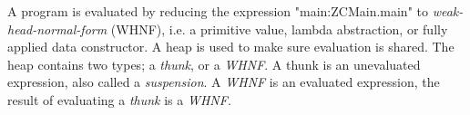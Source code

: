 A program is evaluated by reducing the expression "main:ZCMain.main" to 
\emph{weak-head-normal-form} (WHNF), i.e. a primitive value, lambda abstraction, or 
fully applied data constructor. A heap is used to make
sure evaluation is shared. The heap contains two types; a \emph{thunk}, 
or a \emph{WHNF}. A thunk is an unevaluated
expression, also called a \emph{suspension}. A \emph{WHNF} is an evaluated expression, 
the result of evaluating a \emph{thunk} is a \emph{WHNF}. \cite{tolmach2010ghc}

\begin{comment}
\subsection{Informal semantics of Core}

Core resembles a explicitly-typed polymorphic lambda-calculus ($F_{w}$), with some additions,
local let bindings, algebraic type definitions, constructors, case-expressions, primitive types,
literals and operators.\cite{tolmach2010ghc}

\subsubsection{Program organization and modules}

Programs represented in Core are organized into modules corresponding directly to source-level
Haskell modules. A module identifier (\emph{mident}) consists of a \emph{package name} followed
by a module name. 

Each module may contain each of the following top-level declarations:
\begin{itemize}
\item{Algebraic datatype declarations:} each defining a type constructor and one or more data
constructors.
\item{Newtype declarations:} corresponding to Haskell newtype declarations, each defining a 
type constructor and a coercion name.
\item{Value declarations:} defining the types and values of top-level variables.
\end{itemize}


\cite{tolmach2010ghc}


\subsubsection{Namespaces}

There are five distinct namespaces:
\begin{enumerate}


\end{comment}
